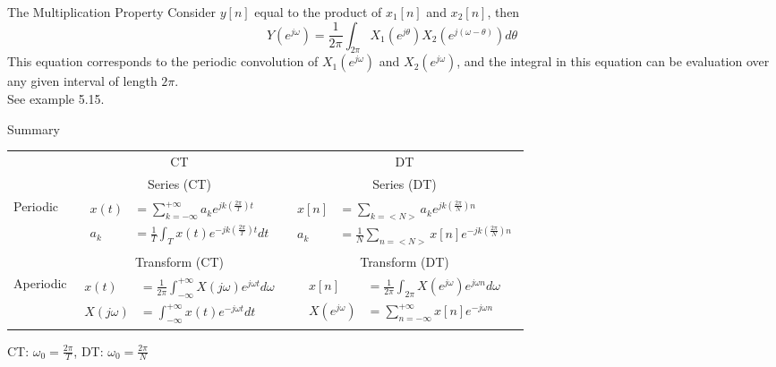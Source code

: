 \begin{frame}{The Multiplication Property}
    Consider $y[n]$ equal to the product of $x_1[n]$ and $x_2[n]$, then
    \begin{equation*}
        Y(e^{j\omega}) = \frac{1}{2\pi}\int_{2\pi}X_1(e^{j\theta})X_2(e^{j(\omega - \theta)})d\theta
    \end{equation*}
    This equation corresponds to the \alert{periodic convolution} of $X_1(e^{j\omega})$ and $X_2(e^{j\omega})$, and the integral in this equation can be evaluation over any given interval of length $2\pi$.\\

    See example 5.15.
\end{frame}

\begin{frame}{Summary}
\centering
{%
    \begin{tabular}{lcc}

    & CT & DT\\
        \cline{2-3}
    & Series (CT) & Series (DT)\\
    \cline{2-3}
    Periodic &
    $\begin{aligned}
        x(t) &= \sum_{k=-\infty}^{+\infty}a_k e^{jk\left(\frac{2\pi}{T}\right)t}\\
        a_k &= \frac{1}{T} \int_{T}x(t)e^{-jk\left(\frac{2\pi}{T}\right) t}dt
    \end{aligned}$\par

    &
    $\begin{aligned}
        x[n] &= \sum_{k=<N>}a_k e^{jk\left(\frac{2\pi}{N}\right) n}\\
        a_k &= \frac{1}{N} \sum_{n=<N>}x[n]e^{-jk\left(\frac{2\pi}{N}\right)n}
    \end{aligned}$\par
    \\[4ex]
        \cline{2-3}
     & Transform (CT) & Transform (DT)\\
    \cline{2-3}
    Aperiodic &
    $\begin{aligned}
        x(t) &= \frac{1}{2\pi}\int_{-\infty}^{+\infty} X(j\omega)e^{j\omega t}d\omega\\
        X(j\omega) &=  \int_{-\infty}^{+\infty}x(t)e^{-j\omega t}dt
    \end{aligned}$\par

    &


    $\begin{aligned}
        x[n] &= \frac{1}{2\pi}\int_{2\pi} X(e^{j\omega})e^{j\omega n}d\omega\\
        X(e^{j\omega}) &= \sum_{n=-\infty}^{+\infty}x[n]e^{-j\omega n}
    \end{aligned}$\par
    \\[4ex]
        \cline{2-3}
    \end{tabular}
    }

    CT: $\omega_0 = \frac{2\pi}{T}$, DT: $\omega_0 = \frac{2\pi}{N}$

\end{frame}

